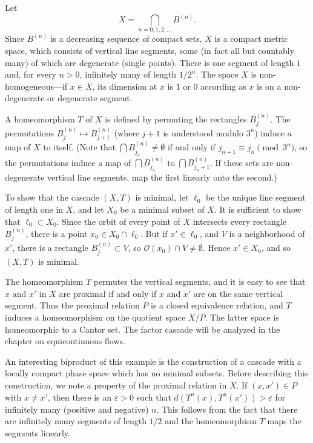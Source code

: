 Let
\[
    X = \bigcap_{n = 0, 1, 2, \ldots} B^{(n)}.
\]
Since $B^{(n)}$ is a decreasing sequence of compact sets, $X$ is a compact metric
space, which consists of vertical line segments, some (in fact all but countably many)
of which are degenerate (single points). There is one segment of length $1$ and,
for every $n > 0$, infinitely many of length $1 / 2^n$. The space $X$ is
non-homogeneous—if $x \in X$, its dimension at $x$ is $1$ or $0$ according
as $x$ is on a non-degenerate or degenerate segment.


A homeomorphism $T$ of $X$ is defined by permuting the rectangles $B^{(n)}_j$. The permutations $B^{(n)}_j \mapsto B^{(n)}_{j+1}$ (where $j+1$ is understood modulo $3^n$) induce a map of $X$ to itself. (Note that $\bigcap B^{(n)}_{j_n} \neq \emptyset$ if and only if $j_{n+1} \equiv j_n \pmod{3^n}$, so the permutations induce a map of $\bigcap B^{(n)}_{j_n}$ to $\bigcap B^{(n)}_{j_n+1}$. If these sets are non-degenerate vertical line segments, map the first linearly onto the second.)


To show that the cascade $(X,T)$ is minimal, let $\ell_0$ be the unique line segment of length one in $X$, and let $X_0$ be a minimal subset of $X$. It is sufficient to show that $\ell_0 \subset X_0$. Since the orbit of every point of $X$ intersects every rectangle $B^{(n)}_j$, there is a point $x_0 \in X_0 \cap \ell_0$. But if $x' \in \ell_0$, and $V$ is a neighborhood of $x'$, there is a rectangle $B^{(n)}_j \subset V$, so $\mathcal{O}(x_0) \cap V \neq \emptyset$. Hence $x' \in X_0$, and so $(X,T)$ is minimal.


The homeomorphism $T$ permutes the vertical segments, and it is easy to see that $x$ and $x'$ in $X$ are proximal if and only if $x$ and $x'$ are on the same vertical segment. Thus the proximal relation $P$ is a closed equivalence relation, and $T$ induces a homeomorphism on the quotient space $X/P$. The latter space is homeomorphic to a Cantor set. The factor cascade will be analyzed in the chapter on equicontinuous flows.


An interesting biproduct of this example is the construction of a cascade with a locally compact phase space which has no minimal subsets. Before describing this construction, we note a property of the proximal relation in $X$. If $(x,x') \in P$ with $x \ne x'$, then there is an $\varepsilon > 0$ such that $d(T^n(x), T^n(x')) > \varepsilon$ for infinitely many (positive and negative) $n$. This follows from the fact that there are infinitely many segments of length $1/2$ and the homeomorphism $T$ maps the segments linearly.



